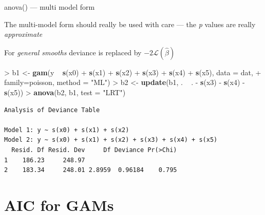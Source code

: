 \documentclass[10pt,ignorenonframetext,compress, aspectratio=169]{beamer}
\newenvironment{Shaded}{\begin{snugshade}}{\end{snugshade}}
\newcommand{\KeywordTok}[1]{\textcolor[rgb]{0.13,0.29,0.53}{\textbf{{#1}}}}
\newcommand{\DataTypeTok}[1]{\textcolor[rgb]{0.13,0.29,0.53}{{#1}}}
\newcommand{\StringTok}[1]{\textcolor[rgb]{0.31,0.60,0.02}{{#1}}}
\newcommand{\NormalTok}[1]{{#1}}
\begin{document}
\begin{frame}[fragile]{anova() --- multi model form}

The multi-model form should really be used with care --- the \emph{p}
values are really \emph{approximate}

For \emph{general smooths} deviance is replaced by
\(-2\mathcal{L}(\hat{\beta})\)

\begin{Shaded}
\begin{Highlighting}[]
\NormalTok{>}\StringTok{ }\NormalTok{b1 <-}\StringTok{ }\KeywordTok{gam}\NormalTok{(y ~}\StringTok{ }\KeywordTok{s}\NormalTok{(x0) +}\StringTok{ }\KeywordTok{s}\NormalTok{(x1) +}\StringTok{ }\KeywordTok{s}\NormalTok{(x2) +}\StringTok{ }\KeywordTok{s}\NormalTok{(x3) +}\StringTok{ }\KeywordTok{s}\NormalTok{(x4) +}\StringTok{ }\KeywordTok{s}\NormalTok{(x5), }\DataTypeTok{data =} \NormalTok{dat,}
\NormalTok{+}\StringTok{           }\DataTypeTok{family=}\NormalTok{poisson, }\DataTypeTok{method =} \StringTok{"ML"}\NormalTok{)}
\NormalTok{>}\StringTok{ }\NormalTok{b2 <-}\StringTok{ }\KeywordTok{update}\NormalTok{(b1, . ~}\StringTok{ }\NormalTok{. -}\StringTok{ }\KeywordTok{s}\NormalTok{(x3) -}\StringTok{ }\KeywordTok{s}\NormalTok{(x4) -}\StringTok{ }\KeywordTok{s}\NormalTok{(x5))}
\NormalTok{>}\StringTok{ }\KeywordTok{anova}\NormalTok{(b2, b1, }\DataTypeTok{test =} \StringTok{"LRT"}\NormalTok{)}
\end{Highlighting}
\end{Shaded}

\begin{verbatim}
Analysis of Deviance Table

Model 1: y ~ s(x0) + s(x1) + s(x2)
Model 2: y ~ s(x0) + s(x1) + s(x2) + s(x3) + s(x4) + s(x5)
  Resid. Df Resid. Dev     Df Deviance Pr(>Chi)
1    186.23     248.97                         
2    183.34     248.01 2.8959  0.96184    0.795
\end{verbatim}

\end{frame}

\section{AIC for GAMs}\label{aic-for-gams}
\end{document}
